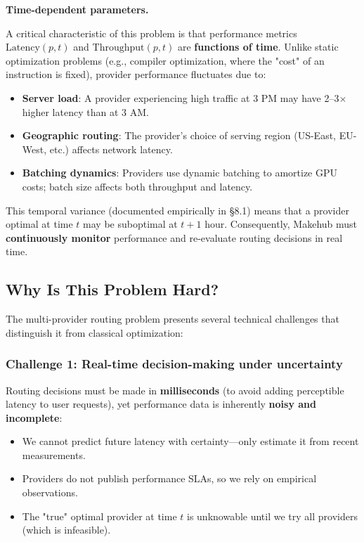 \documentclass[english]{article}
\begin{document}
\medskip

\noindent\textbf{Time-dependent parameters.}

A critical characteristic of this problem is that performance metrics $\text{Latency}(p, t)$ and $\text{Throughput}(p, t)$ are \textbf{functions of time}. Unlike static optimization problems (e.g., compiler optimization, where the "cost" of an instruction is fixed), provider performance fluctuates due to:
\begin{itemize}
    \item \textbf{Server load}: A provider experiencing high traffic at 3 PM may have 2--3$\times$ higher latency than at 3 AM.
    \item \textbf{Geographic routing}: The provider's choice of serving region (US-East, EU-West, etc.) affects network latency.
    \item \textbf{Batching dynamics}: Providers use dynamic batching to amortize GPU costs; batch size affects both throughput and latency.
\end{itemize}

This temporal variance (documented empirically in §8.1) means that a provider optimal at time $t$ may be suboptimal at $t + 1$ hour. Consequently, Makehub must \textbf{continuously monitor} performance and re-evaluate routing decisions in real time.

\subsection{Why Is This Problem Hard?}

The multi-provider routing problem presents several technical challenges that distinguish it from classical optimization:

\subsubsection{Challenge 1: Real-time decision-making under uncertainty}

Routing decisions must be made in \textbf{milliseconds} (to avoid adding perceptible latency to user requests), yet performance data is inherently \textbf{noisy and incomplete}:
\begin{itemize}
    \item We cannot predict future latency with certainty—only estimate it from recent measurements.
    \item Providers do not publish performance SLAs, so we rely on empirical observations.
    \item The "true" optimal provider at time $t$ is unknowable until we try all providers (which is infeasible).
\end{itemize}
\end{document}
